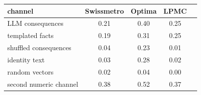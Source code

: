 \begin{tabular}{lcccc}
\toprule
channel & Swissmetro & Optima & LPMC \\
\midrule
LLM consequences & 0.21 & 0.40 & 0.25 \\
templated facts & 0.19 & 0.31 & 0.25 \\
shuffled consequences & 0.04 & 0.23 & 0.01 \\
identity text & 0.03 & 0.28 & 0.02 \\
random vectors & 0.02 & 0.04 & 0.00 \\
second numeric channel & 0.38 & 0.52 & 0.37 \\
\bottomrule
\end{tabular}